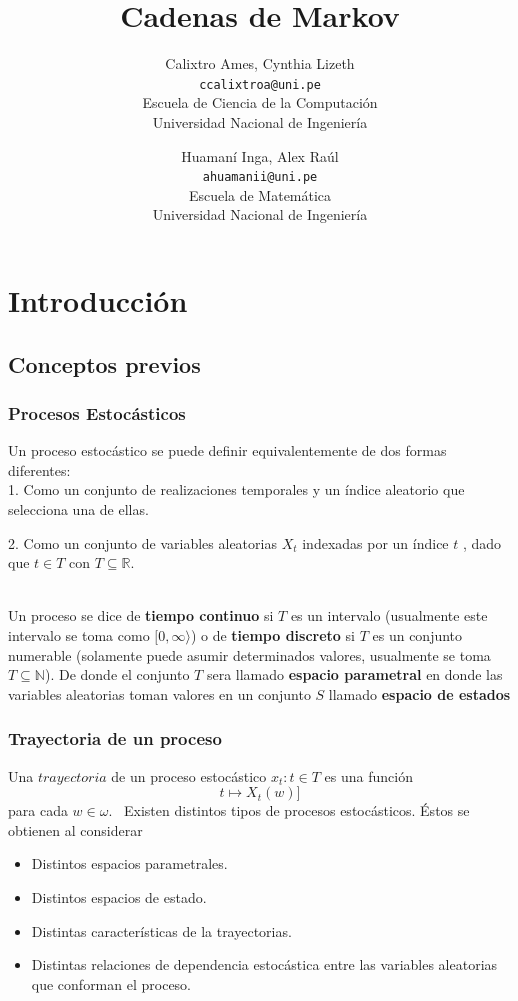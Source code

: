 \documentclass{article}
\title{Cadenas de Markov}
\author{
	Calixtro Ames, Cynthia Lizeth\\
	\texttt{ccalixtroa@uni.pe}\\
	\small{Escuela de Ciencia de la Computación}\\
	\small{Universidad Nacional de Ingeniería}
	\and
	Huamaní Inga, Alex Raúl\\
	\texttt{ahuamanii@uni.pe}\\
	\small{Escuela de Matemática}\\
	\small{Universidad Nacional de Ingeniería}
}
\theoremstyle{definition}
\theoremstyle{remark}
\begin{document}
\maketitle


\section{Introducción}
\subsection{Conceptos previos}
\subsubsection{Procesos Estocásticos}\label{sec:nada}

Un proceso estocástico se puede definir equivalentemente de dos formas diferentes:\\

1. Como un conjunto de realizaciones temporales y un índice aleatorio que selecciona una de ellas.\

2. Como un conjunto de variables aleatorias $X_{t}$ indexadas por un índice $t$ , dado que $t \in T$ con $T\subseteq \mathbb{R} $.
\\\

Un proceso se dice de \textbf{tiempo continuo} si $T$ es un intervalo (usualmente este intervalo se toma como $[0,\infty\rangle$) o de \textbf{tiempo discreto} si $T$ es un conjunto numerable (solamente puede asumir determinados valores, usualmente se toma $T \subseteq \mathbb{N}$). De donde el conjunto $T$ sera llamado \textbf{espacio parametral} en donde las variables aleatorias toman valores en un conjunto $S$ llamado \textbf{espacio de estados}

\subsubsection{Trayectoria de un proceso}\label{sec:nada2}
Una $trayectoria$ de un proceso estocástico $x_{t}: t \in T$ es una función $$t \longmapsto X_{t}(w)]$$ para cada $w \in \omega.$
\ Existen distintos tipos de procesos estocásticos. Éstos se obtienen al considerar 
\begin{itemize}
	\item Distintos espacios parametrales.
	\item Distintos espacios de estado.
	\item Distintas características de la trayectorias.
	\item Distintas relaciones de dependencia estocástica entre las variables aleatorias que conforman el proceso.
\end{itemize}
\end{document}
